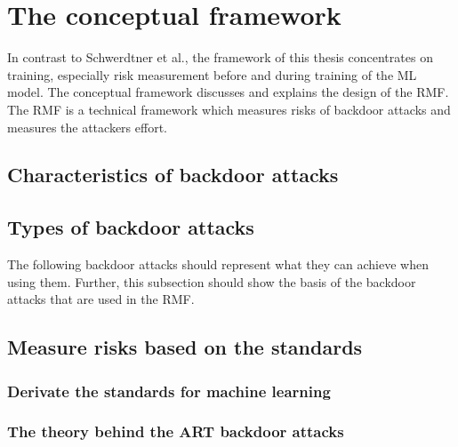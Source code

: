 \section{The conceptual framework}
\label{sec:conFrame}

In contrast to Schwerdtner et al., the framework of this thesis concentrates on training, especially risk measurement before and during training of the ML model.
The conceptual framework discusses and explains the design of the RMF. The RMF is a technical framework which measures risks of backdoor attacks and measures the attackers effort.

\subsection{Characteristics of backdoor attacks}


\subsection{Types of backdoor attacks}

The following backdoor attacks should represent what they can achieve when using them. Further, this subsection should show the basis of the backdoor attacks that are used in the RMF.

\subsection{Measure risks based on the standards}


\subsubsection*{Derivate the standards for machine learning}


\subsubsection*{The theory behind the ART backdoor attacks}

